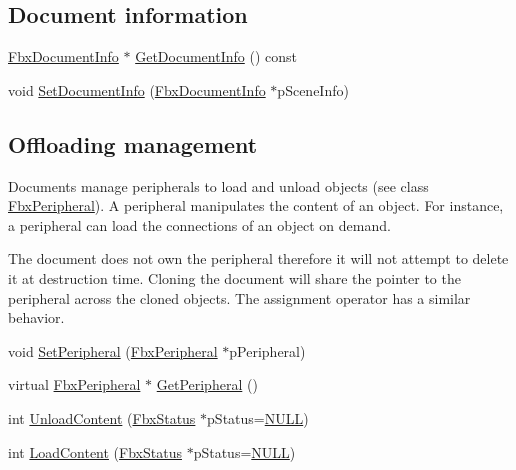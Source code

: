 \subsection*{Document information}
\begin{DoxyCompactItemize}
\item 
\hyperlink{class_fbx_document_info}{Fbx\+Document\+Info} $\ast$ \hyperlink{class_fbx_document_a396a7cf0d0c422a872a6df2cec608b11}{Get\+Document\+Info} () const
\item 
void \hyperlink{class_fbx_document_a6dafa0189db8b2088dc46965b210d613}{Set\+Document\+Info} (\hyperlink{class_fbx_document_info}{Fbx\+Document\+Info} $\ast$p\+Scene\+Info)
\end{DoxyCompactItemize}
\subsection*{Offloading management}
\label{_amgrp5a9e184179142b7f1106fc32585577bf}%
Documents manage peripherals to load and unload objects (see class \hyperlink{class_fbx_peripheral}{Fbx\+Peripheral}). A peripheral manipulates the content of an object. For instance, a peripheral can load the connections of an object on demand.

The document does not own the peripheral therefore it will not attempt to delete it at destruction time. Cloning the document will share the pointer to the peripheral across the cloned objects. The assignment operator has a similar behavior. \begin{DoxyCompactItemize}
\item 
void \hyperlink{class_fbx_document_aff0bbbef68acec40c0a2d49a98021f0a}{Set\+Peripheral} (\hyperlink{class_fbx_peripheral}{Fbx\+Peripheral} $\ast$p\+Peripheral)
\item 
virtual \hyperlink{class_fbx_peripheral}{Fbx\+Peripheral} $\ast$ \hyperlink{class_fbx_document_a83abd11e3c318ab4f20a23282626bb7d}{Get\+Peripheral} ()
\item 
int \hyperlink{class_fbx_document_a76c37d7528bf2be38b1de4ef7b60dfbb}{Unload\+Content} (\hyperlink{class_fbx_status}{Fbx\+Status} $\ast$p\+Status=\hyperlink{fbxarch_8h_a070d2ce7b6bb7e5c05602aa8c308d0c4}{N\+U\+LL})
\item 
int \hyperlink{class_fbx_document_a644922727fcff7fad8706d9104b3a7b6}{Load\+Content} (\hyperlink{class_fbx_status}{Fbx\+Status} $\ast$p\+Status=\hyperlink{fbxarch_8h_a070d2ce7b6bb7e5c05602aa8c308d0c4}{N\+U\+LL})
\end{DoxyCompactItemize}

